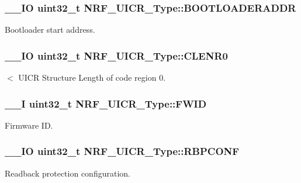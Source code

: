 \subsubsection[{B\+O\+O\+T\+L\+O\+A\+D\+E\+R\+A\+D\+D\+R}]{\setlength{\rightskip}{0pt plus 5cm}\+\_\+\+\_\+\+I\+O uint32\+\_\+t N\+R\+F\+\_\+\+U\+I\+C\+R\+\_\+\+Type\+::\+B\+O\+O\+T\+L\+O\+A\+D\+E\+R\+A\+D\+D\+R}\label{struct_n_r_f___u_i_c_r___type_af0860e87933bb29d82fd5e2fb33c95cd}
Bootloader start address. \hypertarget{struct_n_r_f___u_i_c_r___type_a525ea1f50cb00593232155f8a8a5f7fa}{}
\subsubsection[{C\+L\+E\+N\+R0}]{\setlength{\rightskip}{0pt plus 5cm}\+\_\+\+\_\+\+I\+O uint32\+\_\+t N\+R\+F\+\_\+\+U\+I\+C\+R\+\_\+\+Type\+::\+C\+L\+E\+N\+R0}\label{struct_n_r_f___u_i_c_r___type_a525ea1f50cb00593232155f8a8a5f7fa}
$<$ U\+I\+C\+R Structure Length of code region 0. \hypertarget{struct_n_r_f___u_i_c_r___type_ad41788e5c78a1227a2ec85a345233150}{}
\subsubsection[{F\+W\+I\+D}]{\setlength{\rightskip}{0pt plus 5cm}\+\_\+\+\_\+\+I uint32\+\_\+t N\+R\+F\+\_\+\+U\+I\+C\+R\+\_\+\+Type\+::\+F\+W\+I\+D}\label{struct_n_r_f___u_i_c_r___type_ad41788e5c78a1227a2ec85a345233150}
Firmware I\+D. \hypertarget{struct_n_r_f___u_i_c_r___type_aa0e2cc7eb94761f541cec70298b3b46c}{}
\subsubsection[{R\+B\+P\+C\+O\+N\+F}]{\setlength{\rightskip}{0pt plus 5cm}\+\_\+\+\_\+\+I\+O uint32\+\_\+t N\+R\+F\+\_\+\+U\+I\+C\+R\+\_\+\+Type\+::\+R\+B\+P\+C\+O\+N\+F}\label{struct_n_r_f___u_i_c_r___type_aa0e2cc7eb94761f541cec70298b3b46c}
Readback protection configuration. \hypertarget{struct_n_r_f___u_i_c_r___type_a30dee3ac4cd33585413eaddb062a43a6}{}

